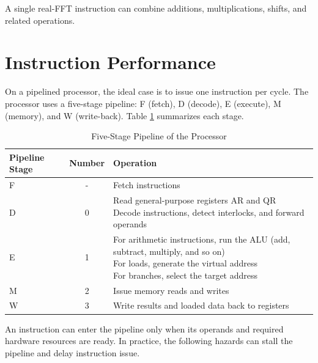 \documentclass[main\_\_EN.tex]{subfiles}
\begin{document}
A single real-FFT instruction can combine additions, multiplications, shifts, and related operations.














\section{Instruction Performance}\label{subsec:pie_pipeline}
On a pipelined processor, the ideal case is to issue one instruction per cycle. The \chipname{} processor uses a five-stage pipeline: F (fetch), D (decode), E (execute), M (memory), and W (write-back). Table \ref{tab:pie_processor_5stage} summarizes each stage.\\

\begin{longtable}[c]{|l|c|l|}
    \caption{Five-Stage Pipeline of the \chipname{} Processor}
    \label{tab:pie_processor_5stage}\\
    \hline
    \rowcolor{lightgray}
    \textbf{Pipeline Stage} & \textbf{Number} & \textbf{Operation} \\\hline
    F & - & Fetch instructions\\\hline
    D & 0 & \makecell[l]{Read general-purpose registers AR and QR\\Decode instructions, detect interlocks, and forward operands}\\\hline
    E & 1 & \makecell[l]{For arithmetic instructions, run the ALU (add, subtract, multiply, and so on)\\For loads, generate the virtual address\\For branches, select the target address}\\\hline
    M & 2 & Issue memory reads and writes \\\hline
    W & 3 & Write results and loaded data back to registers\\\hline
\end{longtable}

An instruction can enter the pipeline only when its operands and required hardware resources are ready. In practice, the following hazards can stall the pipeline and delay instruction issue.
\end{document}
